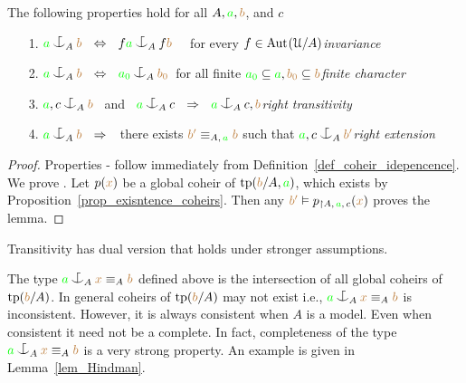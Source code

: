 \documentclass[creche.tex]{subfiles}
\begin{document}
\begin{lemma}\label{lem_coheir_independence}
The following properties hold for all $A,{\color{green} a},{\color{brown} b}$, and $c$
\begin{itemize}
\item[1.] ${\gr a}\nonforkc_A{\mr b}\ \ \IFF\ \ f{\gr a}\nonforkc_Af{\mr b}$ \ \ for every $f\in\textrm{Aut\kern.15ex}(\EuScript U/A)$\hfill \textit{invariance}
\item[2.] ${\gr a}\nonforkc_A{\mr b}\ \ \IFF\ \ {\gr a_0}\nonforkc_{A}{\mr b_0}$\ for all finite ${\color{green} a_0}\subseteq{\color{green}a}, {\color{brown} b_0}\subseteq{\color{brown}b}$\hfill \textit{finite character}
\item[3.] ${\gr a},c\nonforkc_{A}{\mr b}$ \ and \ ${\gr a}\nonforkc_Ac\ \ \IMP\ \ {\gr a}\nonforkc_Ac,{\mr b}$\hfill \textit{right transitivity}
\item[4.] ${\gr a}\nonforkc_A{\mr b}\ \ \IMP\ \ $ there exists ${\color{brown} b'}\equiv_{A,\,{\color{green} a}}{\color{brown} b}$ such that ${\gr a},c\nonforkc_A{\mr b'}$\hfill \textit{right extension}

\end{itemize}
\end{lemma}
\begin{proof}
Properties - follow immediately from Definition~\ref{def_coheir_idepencence}.
We prove .
Let $p({\color{brown} x})$ be a global coheir of ${\rm tp}({\color{brown} b}/A,{\color{green} a})$, which exists by Proposition~\ref{prop_exisntence_coheirs}.
Then any ${\color{brown} b'}\vDash p_{\restriction A,\,{\color{green} a},\,c}({\color{brown} x})$ proves the lemma.
\end{proof}


Transitivity has dual version that holds under stronger assumptions.


The type ${\gr a}\nonforkc_A{\mr x}\equiv_A{\mr b}$ defined above is the intersection of all global coheirs of ${\rm tp}({\color{brown} b}/A)$.
In general coheirs of ${\rm tp}({\color{brown} b}/A)$ may not exist i.e.,  ${\gr a}\nonforkc_A{\mr x}\equiv_A{\mr b}$ is inconsistent.
However, it is always consistent when $A$ is a model.
Even when consistent it need not be a complete.
In fact, completeness  of the type ${\gr a}\nonforkc_A{\mr x}\equiv_A{\mr b}$ is a very strong property.
An example is given in Lemma~\ref{lem_Hindman}.
\end{document}

